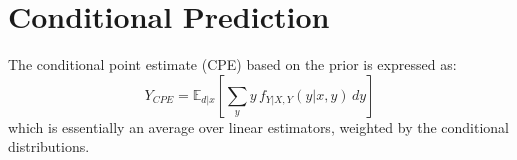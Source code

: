 \documentclass[a4paper, 11pt]{article}
\begin{document}
\section{Conditional Prediction}
The conditional point estimate (CPE) based on the prior is expressed as:
\begin{equation}
Y_{CPE} = \mathbb{E}_{d|x} \left[ \sum_{y} y \, f_{Y|X,Y}(y|x,y) \, dy \right]
\end{equation}
which is essentially an average over linear estimators, weighted by the conditional distributions.
\end{document}
